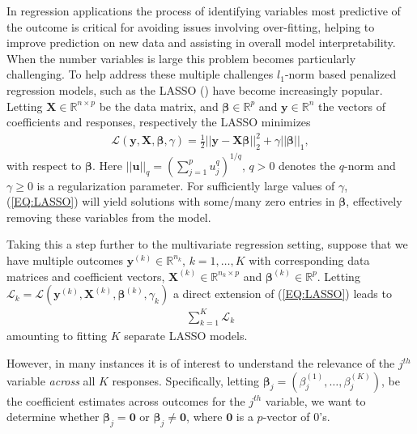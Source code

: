 \documentclass{article}
\numberwithin{equation}{section}
\theoremstyle{plain}
\newcommand{\bs}{\boldsymbol}
\begin{document}
In regression applications the process of identifying variables most predictive
of the outcome is critical for avoiding issues involving over-fitting,
helping to improve prediction on new data and assisting in overall model
interpretability.
When the number variables is large this problem becomes particularly
challenging. 
To help address these multiple challenges $l_1$-norm based penalized regression
models, such as the LASSO (\cite{tibs96lasso}) have become
increasingly popular.
Letting $\mathbf{X} \in \mathbb{R}^{n \times p}$ be the data
matrix, and $\bs\beta \in \mathbb{R}^p$ and $\mathbf{y} \in \mathbb{R}^n$ the
vectors of coefficients and responses, respectively the LASSO minimizes
\begin{align}
\label{EQ:LASSO}
\mathcal{L}(\mathbf{y}, \mathbf{X}, \bs\beta, \gamma) = \frac{1}{2}||\mathbf{y}
- \mathbf{X}\bs\beta||_2^2 + \gamma ||\bs\beta||_1,
\end{align}
\noindent with respect to $\bs\beta$. Here $||\mathbf{u}||_q = (\sum_{j=1}^p
u_j^{q})^{1/q}$, $q > 0$ denotes the $q$-norm and $\gamma \geq 0$ is a regularization
parameter.
For sufficiently large values of $\gamma$,
(\ref{EQ:LASSO}) will yield solutions with some/many zero entries in $\bs\beta$,
effectively removing these variables from the model. 

Taking this a step further to the multivariate regression setting, suppose that
we have multiple outcomes $\mathbf{y}^{(k)} \in \mathbb{R}^{n_k}$, $k = 1,
\ldots, K$ with corresponding data matrices and coefficient vectors,
$\mathbf{X}^{(k)} \in \mathbb{R}^{n_k \times p}$ and $\bs\beta^{(k)} \in
\mathbb{R}^p$. Letting $\mathcal{L}_k = \mathcal{L}(\mathbf{y}^{(k)},
\mathbf{X}^{(k)}, \bs\beta^{(k)}, \gamma_k)$ a direct extension of
(\ref{EQ:LASSO}) leads to
\begin{align}
\label{EQ:MLASSO}
\sum_{k=1}^K \mathcal{L}_k
\end{align}
\noindent amounting to fitting $K$ separate LASSO models. 

However, in many instances it is of interest to understand the relevance of the
$j^{th}$ variable {\it across} all $K$ responses. Specifically, letting
$\bs\beta_j = (\beta^{(1)}_j, \ldots, \beta^{(K)}_j)$, be the coefficient
estimates across outcomes for the $j^{th}$ variable, we want to determine
whether $\bs\beta_j = \mathbf{0}$ or $\bs\beta_j \neq \mathbf{0}$, where
$\mathbf{0}$ is a $p$-vector of 0's. 
\end{document}
